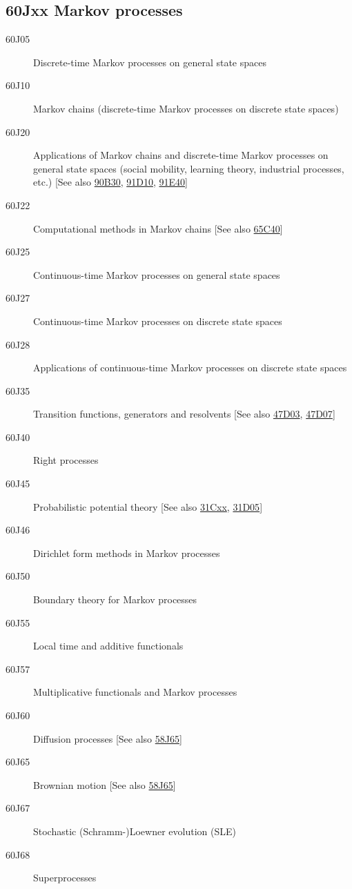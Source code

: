 \documentclass[letterpaper]{article}
\begin{document}
\subsection*{60Jxx  Markov processes }\label{60Jxx}
\begin{description}  
\item [60J05]\label{60J05} Discrete-time Markov processes on general state spaces
\item [60J10]\label{60J10} Markov chains (discrete-time Markov processes on discrete state spaces)
\item [60J20]\label{60J20} Applications of Markov chains and discrete-time Markov processes on general state spaces (social mobility, learning theory, industrial processes, etc.) [See also \hyperref[90B30]{90B30}, \hyperref[91D10]{91D10}, \hyperref[91E40]{91E40}]
\item [60J22]\label{60J22} Computational methods in Markov chains [See also \hyperref[65C40]{65C40}]
\item [60J25]\label{60J25} Continuous-time Markov processes on general state spaces
\item [60J27]\label{60J27} Continuous-time Markov processes on discrete state spaces
\item [60J28]\label{60J28} Applications of continuous-time Markov processes on discrete state spaces
\item [60J35]\label{60J35} Transition functions, generators and resolvents [See also \hyperref[47D03]{47D03}, \hyperref[47D07]{47D07}]
\item [60J40]\label{60J40} Right processes
\item [60J45]\label{60J45} Probabilistic potential theory [See also \hyperref[31Cxx]{31Cxx}, \hyperref[31D05]{31D05}]
\item [60J46]\label{60J46} Dirichlet form methods in Markov processes
\item [60J50]\label{60J50} Boundary theory for Markov processes
\item [60J55]\label{60J55} Local time and additive functionals
\item [60J57]\label{60J57} Multiplicative functionals and Markov processes
\item [60J60]\label{60J60} Diffusion processes [See also \hyperref[58J65]{58J65}]
\item [60J65]\label{60J65} Brownian motion [See also \hyperref[58J65]{58J65}]
\item [60J67]\label{60J67} Stochastic (Schramm-)Loewner evolution (SLE)
\item [60J68]\label{60J68} Superprocesses

\end{description}
\end{document}
